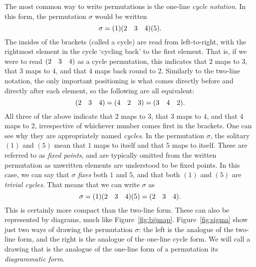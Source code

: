 \begin{example}
    The most common way to write permutations is the one-line \textit{cycle notation}. In this form, the permutation $\sigma$ would be written
    \[
    \sigma = (1)(2 \quad 3 \quad 4)(5).
    \]
    The insides of the brackets (called a cycle) are read from left-to-right, with the rightmost element in the cycle `cycling back' to the first element. That is, if we were to read $(2 \quad 3 \quad 4)$ as a cycle permutation, this indicates that $2$ maps to $3$, that $3$ maps to $4$, and that $4$ maps back round to $2$. Similarly to the two-line notation, the only important positioning is what comes directly before and directly after each element, so the following are all equivalent:
    \[
    (2 \quad 3 \quad 4) = (4 \quad 2 \quad 3) = (3 \quad 4 \quad 2).
    \]
    All three of the above indicate that $2$ maps to $3$, that $3$ maps to $4$, and that $4$ maps to $2$, irrespective of whichever number comes first in the brackets. One can see why they are appropriately named \textit{cycles}. In the permutation $\sigma$, the solitary $(1)$ and $(5)$ mean that $1$ maps to itself and that $5$ maps to itself. These are referred to as \textit{fixed points}, and are typically omitted from the written permutation as unwritten elements are understood to be fixed points. In this case, we can say that $\sigma$ \textit{fixes} both $1$ and $5$, and that both $(1)$ and $(5)$ are \textit{trivial cycles}. That means that we can write $\sigma$ as
    \[
    \sigma = (1)(2 \quad 3 \quad 4)(5) = (2 \quad 3 \quad 4).
    \]
    This is certainly more compact than the two-line form. These can also be represented by diagrams, much like Figure~\ref{fig:bijmap}. Figure~\ref{fig:sigma} show just two ways of drawing the permutation $\sigma$: the left is the analogue of the two-line form, and the right is the analogue of the one-line cycle form. We will call a drawing that is the analogue of the one-line form of a permutation its \textit{diagrammatic form}.

    \begin{figure}[ht]
        \centering
\end{figure}
\end{example}
